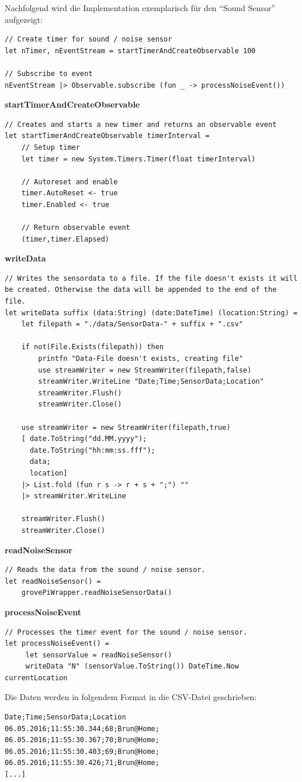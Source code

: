Nachfolgend wird die Implementation exemplarisch für den "`Sound Sensor"' aufgezeigt:
\begin{lstlisting}
// Create timer for sound / noise sensor
let nTimer, nEventStream = startTimerAndCreateObservable 100 

// Subscribe to event
nEventStream |> Observable.subscribe (fun _ -> processNoiseEvent())
\end{lstlisting}

\textbf{startTimerAndCreateObservable}
\begin{lstlisting}
// Creates and starts a new timer and returns an observable event
let startTimerAndCreateObservable timerInterval =
    // Setup timer
    let timer = new System.Timers.Timer(float timerInterval)

    // Autoreset and enable
    timer.AutoReset <- true
    timer.Enabled <- true

    // Return observable event
    (timer,timer.Elapsed)
\end{lstlisting} 

\textbf{writeData}
\begin{lstlisting}
// Writes the sensordata to a file. If the file doesn't exists it will be created. Otherwise the data will be appended to the end of the file.
let writeData suffix (data:String) (date:DateTime) (location:String) = 
    let filepath = "./data/SensorData-" + suffix + ".csv"

    if not(File.Exists(filepath)) then
        printfn "Data-File doesn't exists, creating file"
        use streamWriter = new StreamWriter(filepath,false)
        streamWriter.WriteLine "Date;Time;SensorData;Location"
        streamWriter.Flush()
        streamWriter.Close()

    use streamWriter = new StreamWriter(filepath,true)
    [ date.ToString("dd.MM.yyyy");
      date.ToString("hh:mm:ss.fff");
      data;
      location]
    |> List.fold (fun r s -> r + s + ";") ""
    |> streamWriter.WriteLine

    streamWriter.Flush()
    streamWriter.Close()
\end{lstlisting} 

\textbf{readNoiseSensor}
\begin{lstlisting}
// Reads the data from the sound / noise sensor. 
let readNoiseSensor() = 
	grovePiWrapper.readNoiseSensorData()
\end{lstlisting}  
   
   
\textbf{processNoiseEvent}
\begin{lstlisting}
// Processes the timer event for the sound / noise sensor.
let processNoiseEvent() =
     let sensorValue = readNoiseSensor()
     writeData "N" (sensorValue.ToString()) DateTime.Now currentLocation
\end{lstlisting}

Die Daten werden in folgendem Format in die CSV-Datei geschrieben:
\begin{lstlisting}
Date;Time;SensorData;Location
06.05.2016;11:55:30.344;68;Brun@Home;
06.05.2016;11:55:30.367;70;Brun@Home;
06.05.2016;11:55:30.403;69;Brun@Home;
06.05.2016;11:55:30.426;71;Brun@Home;
[...]
\end{lstlisting}